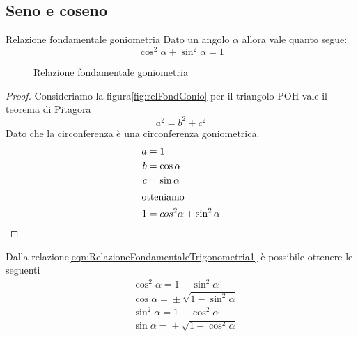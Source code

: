 \subsection{Seno e coseno}
\label{sec:RelazioniFondamentaliSenoCoseno}
\begin{teoremat}{Relazione fondamentale goniometria}{}
Dato un angolo $\alpha$ allora vale quanto segue:
\begin{equation*}
\cos^2\alpha+\sin^2\alpha=1\label{eqn:RelazioneFondamentaleTrigonometria1}
\end{equation*}
\end{teoremat}
\begin{figure}
	\centering
	
\caption{Relazione fondamentale goniometria}\label{fig:relFondGonio}
\end{figure}
\begin{proof}
	Consideriamo la figura\nobs\vref{fig:relFondGonio} per il triangolo POH vale il teorema di Pitagora \[a^2=b^2+c^2\] Dato che la circonferenza è una circonferenza goniometrica.
	\begin{align*}
	a&=1\\
	b&=\cos\alpha\\
	c&=\sin\alpha\\
	\intertext{otteniamo}
	1&=cos^2\alpha+\sin^2\alpha\\
	\end{align*}
\end{proof}
Dalla relazione\nobs\vref{eqn:RelazioneFondamentaleTrigonometria1} è possibile ottenere le seguenti
\begin{align*}
&\cos^{2}\alpha={}1-\sin^{2}\alpha\\
&\cos\alpha={}\pm\sqrt{1-\sin^{2}\alpha}\\
&\sin^{2}\alpha={}1-\cos^{2}\alpha \\
&\sin\alpha={}\pm\sqrt{1-\cos^{2}\alpha}
\end{align*}

